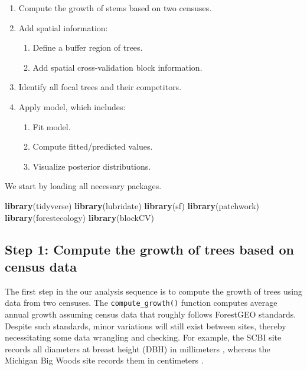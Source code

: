 \documentclass[12pt]{article}
\providecommand{\tightlist}{%
  \setlength{\itemsep}{0pt}\setlength{\parskip}{0pt}}
\newenvironment{Shaded}{\begin{snugshade}}{\end{snugshade}}
\newcommand{\KeywordTok}[1]{\textcolor[rgb]{0.13,0.29,0.53}{\textbf{#1}}}
\newcommand{\NormalTok}[1]{#1}
\begin{document}
\begin{enumerate}
\def\labelenumi{\arabic{enumi}.}
\tightlist
\item
  Compute the growth of stems based on two censuses.
\item
  Add spatial information:

  \begin{enumerate}
  \def\labelenumii{\arabic{enumii}.}
  \tightlist
  \item
    Define a buffer region of trees.
  \item
    Add spatial cross-validation block information.
  \end{enumerate}
\item
  Identify all focal trees and their competitors.
\item
  Apply model, which includes:

  \begin{enumerate}
  \def\labelenumii{\arabic{enumii}.}
  \tightlist
  \item
    Fit model.
  \item
    Compute fitted/predicted values.
  \item
    Visualize posterior distributions.
  \end{enumerate}
\end{enumerate}

We start by loading all necessary packages.

\begin{Shaded}
\begin{Highlighting}[]
\KeywordTok{library}\NormalTok{(tidyverse)}
\KeywordTok{library}\NormalTok{(lubridate)}
\KeywordTok{library}\NormalTok{(sf)}
\KeywordTok{library}\NormalTok{(patchwork)}
\KeywordTok{library}\NormalTok{(forestecology)}
\KeywordTok{library}\NormalTok{(blockCV)}
\end{Highlighting}
\end{Shaded}

\hypertarget{step-1-compute-the-growth-of-trees-based-on-census-data}{%
\subsection{Step 1: Compute the growth of trees based on census
data}\label{step-1-compute-the-growth-of-trees-based-on-census-data}}

The first step in the our analysis sequence is to compute the growth of
trees using data from two censuses. The \texttt{compute\_growth()}
function computes average annual growth assuming census data that
roughly follows ForestGEO standards. Despite such standards, minor
variations will still exist between sites, thereby necessitating some
data wrangling and checking. For example, the SCBI site records all
diameters at breast height (DBH) in millimeters
\citet{bourg_initial_2013}, whereas the Michigan Big Woods site records
them in centimeters \citet{allen_michigan_2020}.
\end{document}
